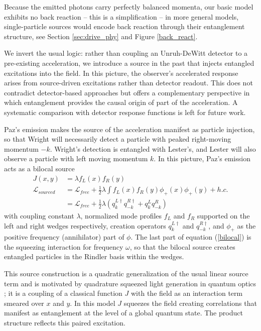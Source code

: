 \documentclass[12pt,a4paper]{article}
\begin{document}
Because the emitted photons carry perfectly balanced momenta, our basic model exhibits no back reaction -- this is a simplification -- in more general models, single-particle sources would encode back reaction through their entanglement structure, see Section \ref{sec:drive_phy} and Figure \ref{back_react}.


We invert the usual logic: rather than coupling an Unruh-DeWitt detector \cite{unruh1976notes,einstein1979general} to a pre-existing acceleration, we introduce a source in the past that injects entangled excitations into the field. In this picture, the observer’s accelerated response arises from source-driven excitations rather than detector readout. This does not contradict detector-based approaches but offers a complementary perspective in which entanglement provides the causal origin of part of the acceleration. A systematic comparison with detector response functions is left for future work.


Paz's emission makes the source of the acceleration manifest as particle injection, so that Wright will necessarily detect a particle with peaked right-moving momentum $-k$. Wright’s detection is entangled with Lester’s, and Lester will also observe a particle with left moving momentum $k$. In this picture, Paz's emission acts as a bilocal source 
\begin{equation}
  \begin{aligned}
    J(x,y) &= \lambda f_L(x)f_R(y)\\
    \mathscr{L}_{sourced} & = \mathscr{L}_{free} + \frac{1}{2}\lambda \int f_L(x)f_R(y) \phi_+(x) \phi_+(y)  + h.c.\\
                        &= \mathscr{L}_{free} + \frac{1}{2}\lambda \left(q_{k}^{L\dagger} q_{-k}^{R\dagger} + q_{k}^{L} q_{-k}^{R} \right)
 \end{aligned}
 \label{bilocal}
\end{equation}
with coupling constant $\lambda$, normalized mode profiles $f_L$ and $f_R$ supported on the left and right wedges respectively, creation operators $q_{k}^{L\dagger}$ and $q_{-k}^{R\dagger}$, and $\phi_+$ as the positive frequency (annihilator) part of $\phi$. The last part of equation (\ref{bilocal}) is the squeezing interaction for frequency $\omega$, so that the bilocal source creates entangled particles in the Rindler basis within the wedges.

This source construction is a quadratic generalization of the usual linear source term \cite{Schwinger_1966} \cite{ryder1996quantum} and is motivated by quadrature squeezed light generation in quantum optics \cite{gerry2023introductory}; it is a coupling of a classical function $J$ with the field as an interaction term smeared over $x$ and $y$. In this model $J$ squeezes the field creating correlations that manifest as entanglement at the level of a global quantum state. The product structure reflects this paired excitation.
\end{document}
